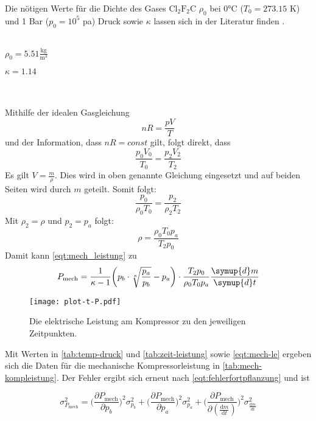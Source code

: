 Die nötigen Werte für die Dichte des Gases $\text{Cl}_\text{2}\text{F}_\text{2}\text{C}$ $\rho_0$ bei 0°C ($T_0 = 273.15$ K) und 1 Bar ($p_0 = 10^5$ pa) Druck sowie $\kappa$ lassen sich in der Literatur finden \cite{206}.
\\ \\
\centerline{$\rho_0 = 5.51 \frac{\textrm{kg}}{\textrm{m}^3}$}
\centerline{$\kappa = 1.14$}
\\ \\
Mithilfe der idealen Gasgleichung
\begin{equation}
  nR = \frac{pV}{T}
\end{equation}
und der Information, dass $nR = const$ gilt, folgt direkt, dass
\begin{equation}
  \frac{p_0 V_0}{T_0} = \frac{p_2 V_2}{T_2}
\end{equation}
Es gilt $V = \frac{m}{\rho}$. Dies wird in oben genannte Gleichung eingesetzt und auf beiden Seiten wird durch $m$ geteilt. Somit folgt:
\begin{equation}
  \frac{p_0}{\rho_0 T_0} = \frac{p_2}{\rho_2 T_2}
\end{equation}
Mit $\rho_2 = \rho$ und $p_2 = p_a$ folgt:
\begin{equation}
  \rho = \frac{\rho_0 T_0 p_a}{T_2 p_0}
\end{equation}
Damit kann \eqref{eqt:mech_leistung} zu
\begin{equation}
\label{eqt:mech-le}
  P_\text{mech} = \frac{1}{\kappa - 1} \bigg(p_b \cdot \sqrt[\kappa]{\frac{p_a}{p_b}} - p_a\bigg) \cdot \frac{T_2 p_0}{\rho_0 T_0 p_a} \frac{\symup{d}m}{\symup{d}t}
\end{equation}


\begin{figure}
  \centering
  \texttt{[image: plot-t-P.pdf]}
  \caption{Die elektrische Leistung am Kompressor zu den jeweiligen Zeitpunkten.}
  \label{fig:plot_zeit-druck}
\end{figure}
Mit Werten in \autoref{tab:temp-druck} und \autoref{tab:zeit-leistung} sowie \eqref{eqt:mech-le} ergeben sich die Daten für die mechanische Kompressorleistung in \autoref{tab:mech-kompleistung}.
Der Fehler ergibt sich erneut nach \eqref{eqt:fehlerfortpflanzung} und ist

\begin{equation}
  \sigma_\text{$P_\text{mech}$}^2 = \bigg( \frac{\partial P_\text{mech}}{\partial p_b} \bigg)^2 \sigma_\text{$p_b$}^2 + \bigg( \frac{\partial P_\text{mech}}{\partial p_a} \bigg)^2 \sigma_\text{$p_a$}^2 + \bigg( \frac{\partial P_\text{mech}}{\partial (\frac{\textrm{d}m}{\textrm{d}t})} \bigg)^2 \sigma_\frac{\textrm{d}m}{\textrm{d}t}^2
\end{equation}

